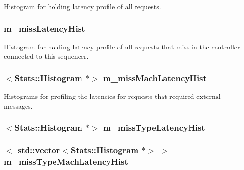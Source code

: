 \hyperlink{classHistogram}{Histogram} for holding latency profile of all requests. \hypertarget{classProfiler_aff6841cbe8b6a9be485b4c45a8208f93}{
\subsubsection[{m\_\-missLatencyHist}]{ {\bf m\_\-missLatencyHist}}}
\label{classProfiler_aff6841cbe8b6a9be485b4c45a8208f93}
\hyperlink{classHistogram}{Histogram} for holding latency profile of all requests that miss in the controller connected to this sequencer. \hypertarget{classProfiler_a55e994bce4da18f7600be6cbf7a4a3b5}{
\subsubsection[{m\_\-missMachLatencyHist}]{$<${\bf Stats::Histogram} $\ast$$>$ {\bf m\_\-missMachLatencyHist}}}
\label{classProfiler_a55e994bce4da18f7600be6cbf7a4a3b5}
Histograms for profiling the latencies for requests that required external messages. \hypertarget{classProfiler_ac5a934c0abe9f0185357eb76de27dee3}{
\subsubsection[{m\_\-missTypeLatencyHist}]{$<${\bf Stats::Histogram} $\ast$$>$ {\bf m\_\-missTypeLatencyHist}}}
\label{classProfiler_ac5a934c0abe9f0185357eb76de27dee3}
\hypertarget{classProfiler_a8e022aebc37a4b83df56956874befd75}{
\subsubsection[{m\_\-missTypeMachLatencyHist}]{$<$ {\bf std::vector}$<${\bf Stats::Histogram} $\ast$$>$ $>$ {\bf m\_\-missTypeMachLatencyHist}}}
